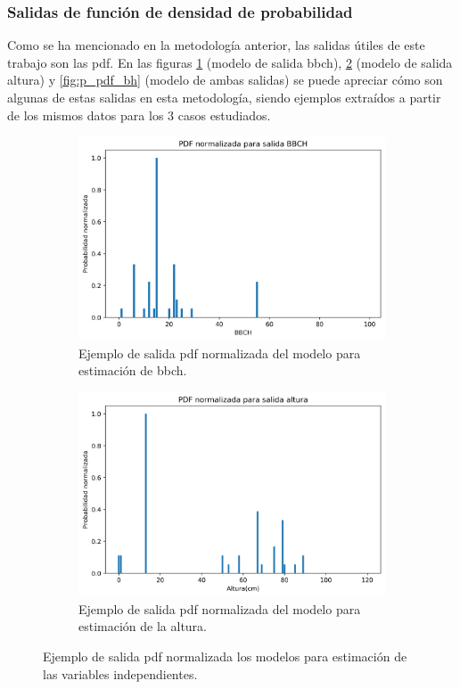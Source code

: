 \subsubsection{Salidas de función de densidad de probabilidad}
Como se ha mencionado en la metodología anterior, las salidas útiles de este trabajo son las \gls{pdf}. En las figuras \ref{fig:p_pdf_b} (modelo de salida \gls{bbch}), \ref{fig:p_pdf_h} (modelo de salida altura) y \ref{fig:p_pdf_bh} (modelo de ambas salidas) se puede apreciar cómo son algunas de estas salidas en esta metodología, siendo ejemplos extraídos a partir de los mismos datos para los 3 casos estudiados. 
\\
\begin{figure}[h]
\centering
\begin{subfigure}{0.6\textwidth}
	\includegraphics[width=\linewidth]{archivos/tfg/Pixel/BBCH_PDF}
	\caption{Ejemplo de salida \gls{pdf} normalizada del 			modelo para estimación de \gls{bbch}.\label{fig:p_pdf_b}}
\end{subfigure}
\begin{subfigure}{0.6\textwidth}
	\centering
	\includegraphics[width=\linewidth]{archivos/tfg/Pixel/H_PDF}
	\caption{Ejemplo de salida \gls{pdf} normalizada del 			modelo para estimación de la altura. \label{fig:p_pdf_h}}
	\end{subfigure}
	\caption{Ejemplo de salida \gls{pdf} normalizada los 			modelos para estimación de las variables independientes. \label{fig:p_pdf}}
\end{figure}

